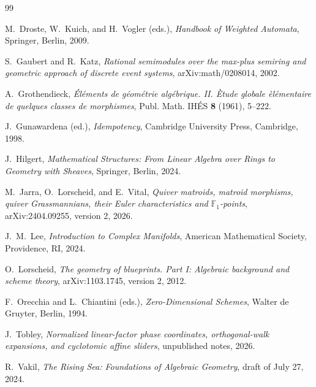 \documentclass[11pt,a4paper]{article}
\theoremstyle{definition}
\theoremstyle{remark}
\begin{document}
\begin{thebibliography}{99}

M.~Droste, W.~Kuich, and H.~Vogler (eds.),
\emph{Handbook of Weighted Automata},
Springer, Berlin, 2009.

S.~Gaubert and R.~Katz,
\emph{Rational semimodules over the max-plus semiring and geometric approach of discrete event systems},
arXiv:math/0208014, 2002.

A.~Grothendieck,
\emph{\'El\'ements de g\'eom\'etrie alg\'ebrique. II. \`Etude globale \`el\'ementaire de quelques classes de morphismes},
Publ. Math. IH\'ES \textbf{8} (1961), 5--222.

J.~Gunawardena (ed.),
\emph{Idempotency},
Cambridge University Press, Cambridge, 1998.

J.~Hilgert,
\emph{Mathematical Structures: From Linear Algebra over Rings to Geometry with Sheaves},
Springer, Berlin, 2024.

M.~Jarra, O.~Lorscheid, and E.~Vital,
\emph{Quiver matroids, matroid morphisms, quiver Grassmannians, their Euler characteristics and $\mathbb F_1$-points},
arXiv:2404.09255, version 2, 2026.

J.~M.~Lee,
\emph{Introduction to Complex Manifolds},
American Mathematical Society, Providence, RI, 2024.

O.~Lorscheid,
\emph{The geometry of blueprints. Part I: Algebraic background and scheme theory},
arXiv:1103.1745, version 2, 2012.

F.~Orecchia and L.~Chiantini (eds.),
\emph{Zero-Dimensional Schemes},
Walter de Gruyter, Berlin, 1994.

J.~Tobley,
\emph{Normalized linear-factor phase coordinates, orthogonal-walk expansions, and cyclotomic affine sliders},
unpublished notes, 2026.

R.~Vakil,
\emph{The Rising Sea: Foundations of Algebraic Geometry},
draft of July 27, 2024.

\end{thebibliography}
\end{document}
